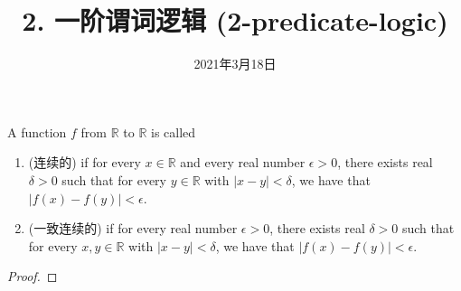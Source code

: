 \documentclass[a4paper, justified]{tufte-handout}
\title{2. 一阶谓词逻辑 (2-predicate-logic)}
\date{2021年3月18日}
\begin{document}
\maketitle
\noplagiarism %
\begin{abstract}
\end{abstract}
\beginrequired
\begin{problem}
  A function $f$ from $\mathbb{R}$ to $\mathbb{R}$ is called
  \begin{enumerate}[(1)]
    \setlength{\itemsep}{10pt}
    \item {} (连续的) if
      for every $x \in \mathbb{R}$
      and every real number $\epsilon > 0$,
      there exists real $\delta > 0$ such that
      for every $y \in \mathbb{R}$ with $|x - y| < \delta$,
      we have that $|f(x) -  f(y)|< \epsilon$.
    \item {} (一致连续的) if
      for every real number $\epsilon > 0$,
      there exists real $\delta > 0$ such that
      for every $x, y \in \mathbb{R}$ with $|x - y| < \delta$,
      we have that $|f(x) -  f(y)|< \epsilon$.
  \end{enumerate}
\end{problem}

\begin{proof}
\end{proof}

\begin{problem}
\end{problem}

\begin{solution}
\end{solution}

\begin{problem}[重言蕴含与推理规则 \score{5 = 3 + 2 ($\star\star\star$)}]
\end{problem}
\end{document}
